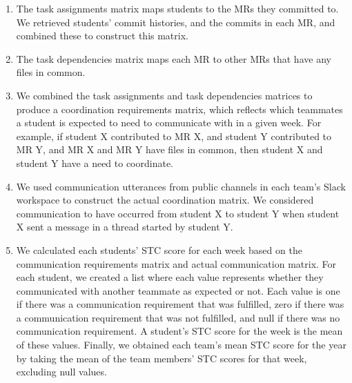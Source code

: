 \begin{enumerate}
\item The task assignments matrix maps students to the MRs they committed to. We retrieved students' commit histories, and the commits in each MR, and combined these to construct this matrix.

\item The task dependencies matrix maps each MR to other MRs that have any files in common. %

\item We combined the task assignments and task dependencies matrices to produce a coordination requirements matrix, which reflects which teammates a student is expected to need to communicate with in a given week. For example, if student X contributed to MR X, and student Y contributed to MR Y, and MR X and MR Y have files in common, then student X and student Y have a need to coordinate.

\item We used communication utterances from public channels in each team's Slack workspace to construct the actual coordination matrix. We considered communication to have occurred from student X to student Y when student X sent a message in a thread started by student Y. 

\item We calculated each students' STC score for each week based on the communication requirements matrix and actual communication matrix. For each student, we created a list where each value represents whether they communicated with another teammate as expected or not. Each value is one if there was a communication requirement that was fulfilled, zero if there was a communication requirement that was not fulfilled, and null if there was no communication requirement. A student's STC score for the week is the mean of these values. Finally, we obtained each team's mean STC score for the year by taking the mean of the team members' STC scores for that week, excluding null values.
\end{enumerate}

